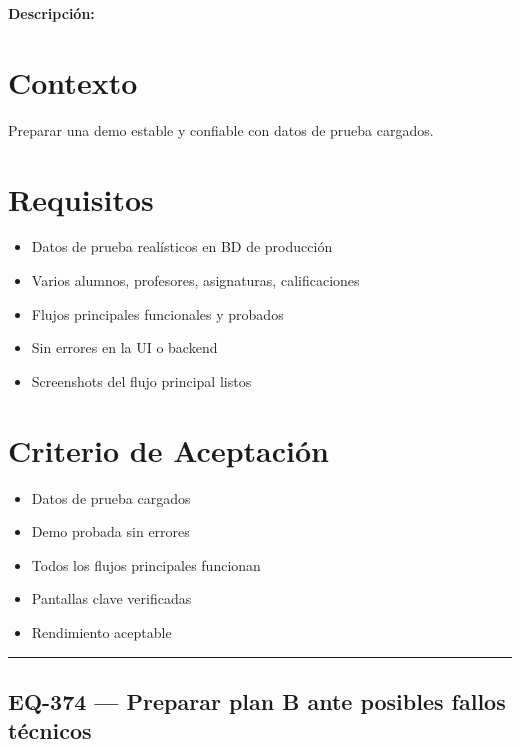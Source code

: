 \documentclass[
  spanish,
  11pt,
]{report}
\providecommand{\tightlist}{%
  \setlength{\itemsep}{0pt}\setlength{\parskip}{0pt}}
\begin{document}
\textbf{Descripción:}

\section{Contexto}\label{contexto-11}

Preparar una demo estable y confiable con datos de prueba cargados.

\section{Requisitos}\label{requisitos-10}

\begin{itemize}
\tightlist
\item
  Datos de prueba realísticos en BD de producción
\item
  Varios alumnos, profesores, asignaturas, calificaciones
\item
  Flujos principales funcionales y probados
\item
  Sin errores en la UI o backend
\item
  Screenshots del flujo principal listos
\end{itemize}

\section{Criterio de Aceptación}\label{criterio-de-aceptaciuxf3n-10}

\begin{itemize}
\tightlist
\item[$\square$]
  Datos de prueba cargados
\item[$\square$]
  Demo probada sin errores
\item[$\square$]
  Todos los flujos principales funcionan
\item[$\square$]
  Pantallas clave verificadas
\item[$\square$]
  Rendimiento aceptable
\end{itemize}

\begin{center}\rule{0.5\linewidth}{0.5pt}\end{center}

\subsection{EQ-374 --- Preparar plan B ante posibles fallos
técnicos}\label{eq-374-preparar-plan-b-ante-posibles-fallos-tuxe9cnicos}
\end{document}
